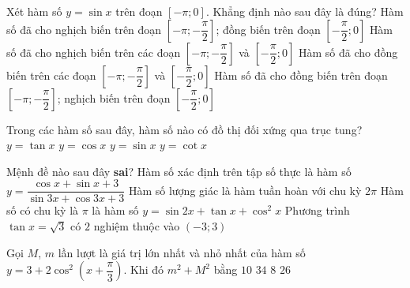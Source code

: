 \begin{ex}%
Xét hàm số $y=\sin x$ trên đoạn $\left[ -\pi ;0 \right]$. Khẳng định nào sau đây là đúng?
\choice
{\True Hàm số đã cho nghịch biến trên đoạn $\left[ -\pi ;-\dfrac{\pi }{2} \right]$; đồng biến trên đoạn $\left[ -\dfrac{\pi }{2};0 \right]$}
{Hàm số đã cho nghịch biến trên các đoạn $\left[ -\pi ;-\dfrac{\pi }{2} \right]$ và $\left[ -\dfrac{\pi }{2};0 \right]$}
{Hàm số đã cho đồng biến trên các đoạn $\left[ -\pi ;-\dfrac{\pi }{2} \right]$ và $\left[ -\dfrac{\pi }{2};0 \right]$}
{Hàm số đã cho đồng biến trên đoạn $\left[ -\pi ;-\dfrac{\pi }{2} \right]$; nghịch biến trên đoạn $\left[ -\dfrac{\pi }{2};0 \right]$}
\end{ex}
\begin{ex}%
Trong các hàm số sau đây, hàm số nào có đồ thị đối xứng qua trục tung?
\choice
{$y=\tan x$}
{\True $y=\cos x$}
{$y=\sin x$}
{$y=\cot x$}
\end{ex}
\begin{ex}%
Mệnh đề nào sau đây \textbf{sai}?
\choice
{Hàm số xác định trên tập số thực là hàm số $y=\dfrac{\cos x+\sin x+3}{\sin 3x+\cos 3x+3}$}
{\True Hàm số lượng giác là hàm tuần hoàn với chu kỳ $2\pi $}
{Hàm số có chu kỳ là $\pi $ là hàm số $y=\sin 2x+\tan x+{{\cos }^2}x$}
{Phương trình $\tan x=\sqrt{3}$ có $2$ nghiệm thuộc vào $\left( -3;3 \right)$}
\end{ex}
\begin{ex}%
Gọi $M$, $m$ lần lượt là giá trị lớn nhất và nhỏ nhất của hàm số $y=3+2{{\cos }^2}\left( x+\dfrac{\pi }{3} \right)$. Khi đó $m^2+M^2$ bằng
\choice
{$10$}
{\True $34$}
{$8$}
{$26$}
\end{ex}
